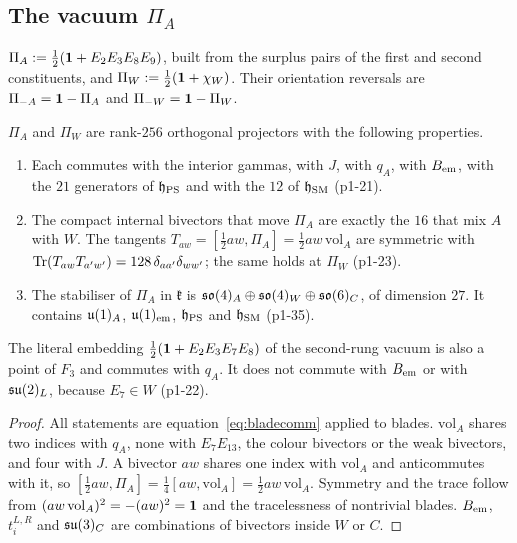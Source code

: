 \subsection{The vacuum \texorpdfstring{$\Pi_A$}{Pi\_A}}
\label{p1:sec:vacuum}

\begin{definition}
\label{p1:def:vacuum}
$\Pi_A:=\tfrac12(\mathbf 1+E_2E_3E_8E_9)$, built from the surplus pairs of the first and second constituents, and $\Pi_W:=\tfrac12(\mathbf 1+\chi_W)$. Their orientation
reversals are $\Pi_{-A}=\mathbf 1-\Pi_A$ and $\Pi_{-W}=\mathbf 1-\Pi_W$.
\end{definition}

\begin{theorem}
\label{p1:thm:vacuum}
$\Pi_A$ and $\Pi_W$ are rank-$256$ orthogonal projectors with the following properties.
\begin{enumerate}[label=(\roman*),leftmargin=2.2em]
\item Each commutes with the interior gammas, with $J$, with $q_A$, with $B_{\rm em}$, with the $21$ generators of $\mathfrak h_{\rm PS}$ and with the $12$ of
$\mathfrak h_{\rm SM}$ (p1-21).
\item The compact internal bivectors that move $\Pi_A$ are exactly the $16$ that mix $A$ with $W$. The tangents $T_{aw}=[\tfrac12aw,\Pi_A]=\tfrac12aw\,\mathrm{vol}_A$ are
symmetric with $\operatorname{Tr}(T_{aw}T_{a'w'})=128\,\delta_{aa'}\delta_{ww'}$; the same holds at $\Pi_W$ (p1-23).
\item The stabiliser of $\Pi_A$ in $\mathfrak k$ is $\mathfrak{so}(4)_A\oplus\mathfrak{so}(4)_W\oplus\mathfrak{so}(6)_C$, of dimension $27$. It contains $\mathfrak{u}(1)_A$, $\mathfrak{u}(1)_{\rm em}$, $\mathfrak h_{\rm PS}$ and
$\mathfrak h_{\rm SM}$ (p1-35).
\end{enumerate}
The literal embedding $\tfrac12(\mathbf 1+E_2E_3E_7E_8)$ of the second-rung vacuum is also a point of $F_3$ and commutes with $q_A$. It does not commute with $B_{\rm em}$ or with
$\mathfrak{su}(2)_L$, because $E_7\in W$ (p1-22).
\end{theorem}

\begin{proof}
All statements are equation~\cref{eq:bladecomm} applied to blades. $\mathrm{vol}_A$ shares two indices with $q_A$, none with $E_7E_{13}$, the colour bivectors or the
weak bivectors, and four with $J$. A bivector $aw$ shares one index with $\mathrm{vol}_A$ and anticommutes with it, so
$[\tfrac12aw,\Pi_A]=\tfrac14[aw,\mathrm{vol}_A]=\tfrac12aw\,\mathrm{vol}_A$. Symmetry and the trace follow from $(aw\,\mathrm{vol}_A)^2=-(aw)^2=\mathbf 1$ and the tracelessness of
nontrivial blades. $B_{\rm em}$, $t^{L,R}_i$ and $\mathfrak{su}(3)_C$ are combinations of bivectors inside $W$ or $C$.
\end{proof}

